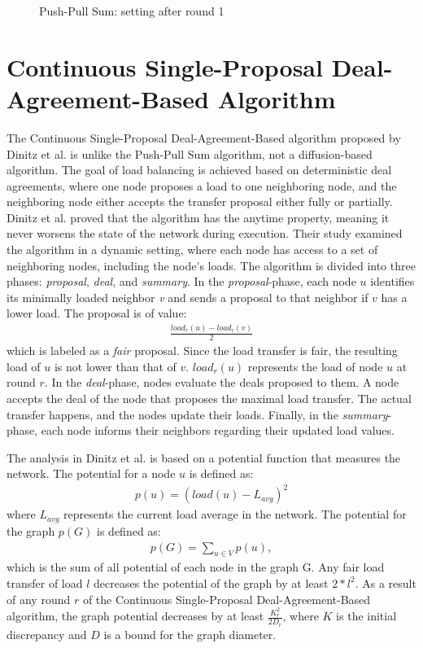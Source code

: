 \begin{figure}
    \centering
    \scalebox{0.75}{}
    \caption{Push-Pull Sum: setting after round 1}
    \label{fig:examplePPSResult}
\end{figure}

\section{Continuous Single-Proposal Deal-Agreement-Based Algorithm}\label{sec:singleproposalDAB}
The Continuous Single-Proposal Deal-Agreement-Based algorithm proposed by Dinitz et al. \cite{Dinitz2023DAB} is unlike the Push-Pull Sum algorithm, not a diffusion-based algorithm. The goal of load balancing is achieved based on deterministic deal agreements, where one node proposes a load to one neighboring node, and the neighboring node either accepts the transfer proposal either fully or partially. Dinitz et al. proved that the algorithm has the anytime property, meaning it never worsens the state of the network during execution. Their study examined the algorithm in a dynamic setting, where each node has access to a set of neighboring nodes, including the node's loads. The algorithm is divided into three phases: \textit{proposal}, \textit{deal}, and \textit{summary}. In the \textit{proposal}-phase, each node $u$ identifies its minimally loaded neighbor \textit{v} and sends a proposal to that neighbor if $v$ has a lower load. The proposal is of value:
\begin{align}
    \frac{load_{r}(u)-load_{r}(v)}{2}    
\end{align}
which is labeled as a \textit{fair} proposal. Since the load transfer is fair, the resulting load of $u$ is not lower than that of $v$. $load_{r}(u)$ represents the load of node $u$ at round $r$. In the \textit{deal}-phase, nodes evaluate the deals proposed to them. A node accepts the deal of the node that proposes the maximal load transfer. The actual transfer happens, and the nodes update their loads. Finally, in the \textit{summary}-phase, each node informs their neighbors regarding their updated load values. \cite{Dinitz2023DAB}



The analysis in Dinitz et al.\cite{Dinitz2023DAB} is based on a potential function that measures the network. The potential for a node $u$ is defined as:
\begin{align}
    p(u) = (load(u)-L_{avg})^{2}    
\end{align}
where $L_{avg}$ represents the current load average in the network. The potential for the graph $p(G)$ is defined as:
\begin{align}
    p(G)=\sum_{u\in V}{p(u)},   
\end{align}
which is the sum of all potential of each node in the graph G. Any fair load transfer of load $l$ decreases the potential of the graph by at least $2*l^{2}$. As a result of any round $r$ of the Continuous Single-Proposal Deal-Agreement-Based algorithm, the graph potential decreases by at least $\frac{K^{2}_r}{2D_r}$, where $K$ is the initial discrepancy and $D$ is a bound for the graph diameter. \cite{Dinitz2023DAB}

